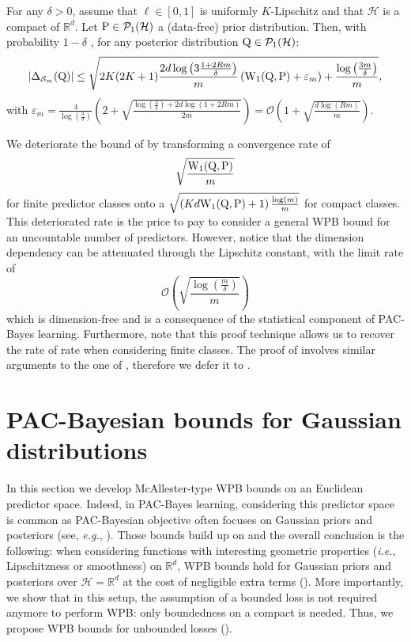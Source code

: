 \begin{theorem}
\label{th: compact_mcall}
For any $\delta>0$, assume that $\ell\in[0,1]$ is uniformly $K$-Lipschitz and that $\mathcal{H}$ is a compact of $\mathbb{R}^d$. Let $\P\in \mathcal{P}_1(\mathcal{H})$ a (data-free) prior distribution.
Then, with probability $1-\delta$ , for any posterior distribution $\Q\in\mathcal{P}_1(\mathcal{H})$:
\[ |\Delta_{\Sm}(\Q)| \leq \sqrt{2K(2K+1)\frac{2d\log\left(3\frac{1 +2Rm }{\delta}\right)}{m} \left(\W_{1}(\Q,\P)+\varepsilon_m  \right) + \frac{\log\left( \frac{3m}{\delta} \right)}{m}  }, \]
with $\varepsilon_m = \frac{4}{\log(\frac{3}{\delta})} \left( 2 + \sqrt{\frac{\log\left(\frac{3}{\delta}\right) + 2d\log(1+2Rm)}{2m}}  \right) = \mathcal{O}\left(1 + \sqrt{\frac{d\log(Rm)}{m}}\right)$.
\end{theorem}
We deteriorate the bound of \cite{amit2022integral} by transforming a convergence rate of $$\sqrt{\frac{\W_{1}(\Q,\P)}{m}}$$ for finite predictor classes onto a  $\sqrt{\left(Kd \W_{1}(\Q,\P)+1\right)\frac{\log(m)}{m}}$ for compact classes. This deteriorated rate is the price to pay to consider a general WPB bound for an uncountable number of predictors. However, notice that the dimension dependency can be attenuated through the Lipschitz constant, with the limit rate of $$\mathcal{O}\left(\sqrt{\frac{\log\left( \frac{m}{\delta} \right)}{m}}\right)$$ which is dimension-free and is a consequence of the statistical component of PAC-Bayes learning. Furthermore, note that this proof technique allows us to recover the rate of \citet{amit2022integral} rate when considering finite classes.
The proof of  involves similar arguments to the one of , therefore we defer it to .

\section{PAC-Bayesian bounds for Gaussian distributions}
\label{sec: wpb_gauss}

In this section we develop McAllester-type WPB bounds on an Euclidean predictor space. Indeed, in PAC-Bayes learning, considering this predictor space is common as PAC-Bayesian objective often focuses on Gaussian priors and posteriors (see, \emph{e.g.}, \citealp{dziugaite2017computing,amit2018meta}).
Those bounds build up on  and the overall conclusion is the following: when considering functions with interesting geometric properties (\emph{i.e.}, Lipschitzness or smoothness) on $\mathbb{R}^d$, WPB bounds hold for Gaussian priors and posteriors over $\mathcal{H}= \mathbb{R}^d$ at the cost of negligible extra terms ().
More importantly, we show that in this setup, the assumption of a bounded loss is not required anymore to perform WPB: only boundedness on a compact is needed. Thus, we propose WPB bounds for unbounded losses ().


